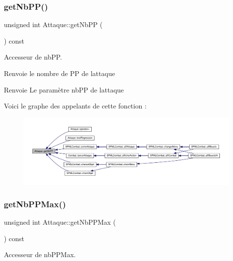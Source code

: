 \subsubsection{\texorpdfstring{get\+Nb\+P\+P()}{getNbPP()}}
{\footnotesize\ttfamily unsigned int Attaque\+::get\+Nb\+PP (\begin{DoxyParamCaption}{ }\end{DoxyParamCaption}) const}



Accesseur de nb\+PP. 

Renvoie le nombre de PP de l\textquotesingle{}attaque \begin{DoxyReturn}{Renvoie}
Le paramètre nb\+PP de l\textquotesingle{}attaque 
\end{DoxyReturn}
Voici le graphe des appelants de cette fonction \+:\nopagebreak
\begin{figure}[H]
\begin{center}
\leavevmode
\includegraphics[width=350pt]{class_attaque_aa95b1e494a9c24dfd28c585e46cd1eb8_icgraph}
\end{center}
\end{figure}
\mbox{\label{class_attaque_a651deeca5e47dd04929bd1c9d013c86e}} 
\subsubsection{\texorpdfstring{get\+Nb\+P\+P\+Max()}{getNbPPMax()}}
{\footnotesize\ttfamily unsigned int Attaque\+::get\+Nb\+P\+P\+Max (\begin{DoxyParamCaption}{ }\end{DoxyParamCaption}) const}



Accesseur de nb\+P\+P\+Max. 

